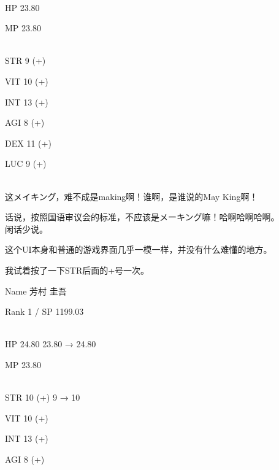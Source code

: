 %  
\\

  HP  23.80

  MP  23.80

%  
\\

  STR  9 (+)

  VIT 10 (+)

  INT 13 (+)

  AGI  8 (+)

  DEX 11 (+)

  LUC  9 (+)

\cardline\\

这メイキング，难不成是making啊！谁啊，是谁说的May King啊！

话说，按照国语审议会的标准，不应该是メーキング嘛！哈啊哈啊哈啊。\\

闲话少说。

这个UI本身和普通的游戏界面几乎一模一样，并没有什么难懂的地方。

我试着按了一下STR后面的+号一次。\\

\cardline

  Name 芳村 圭吾

  Rank 1 / SP 1199.03

%  
\\

  HP  24.80   {23.80 → 24.80}

  MP  23.80

%  
\\

  STR 10 (+)  {9 → 10}

  VIT 10 (+)

  INT 13 (+)

  AGI  8 (+)

